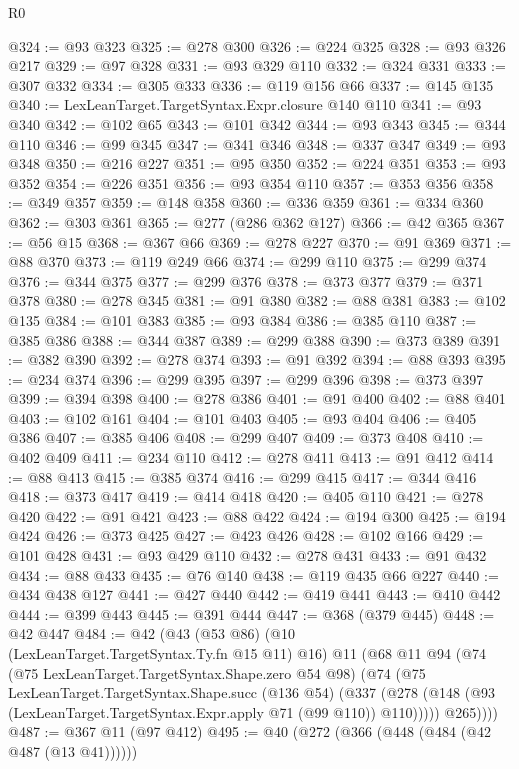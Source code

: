 \begin{lexlean}{R0}
\begin{coremodule}
@324 := @93 @323
@325 := @278 @300
@326 := @224 @325
@328 := @93 @326 @217
@329 := @97 @328
@331 := @93 @329 @110
@332 := @324 @331
@333 := @307 @332
@334 := @305 @333
@336 := @119 @156 @66
@337 := @145 @135
@340 := LexLeanTarget.TargetSyntax.Expr.closure @140 @110
@341 := @93 @340
@342 := @102 @65
@343 := @101 @342
@344 := @93 @343
@345 := @344 @110
@346 := @99 @345
@347 := @341 @346
@348 := @337 @347
@349 := @93 @348
@350 := @216 @227
@351 := @95 @350
@352 := @224 @351
@353 := @93 @352
@354 := @226 @351
@356 := @93 @354 @110
@357 := @353 @356
@358 := @349 @357
@359 := @148 @358
@360 := @336 @359
@361 := @334 @360
@362 := @303 @361
@365 := @277 (@286 @362 @127)
@366 := @42 @365
@367 := @56 @15
@368 := @367 @66
@369 := @278 @227
@370 := @91 @369
@371 := @88 @370
@373 := @119 @249 @66
@374 := @299 @110
@375 := @299 @374
@376 := @344 @375
@377 := @299 @376
@378 := @373 @377
@379 := @371 @378
@380 := @278 @345
@381 := @91 @380
@382 := @88 @381
@383 := @102 @135
@384 := @101 @383
@385 := @93 @384
@386 := @385 @110
@387 := @385 @386
@388 := @344 @387
@389 := @299 @388
@390 := @373 @389
@391 := @382 @390
@392 := @278 @374
@393 := @91 @392
@394 := @88 @393
@395 := @234 @374
@396 := @299 @395
@397 := @299 @396
@398 := @373 @397
@399 := @394 @398
@400 := @278 @386
@401 := @91 @400
@402 := @88 @401
@403 := @102 @161
@404 := @101 @403
@405 := @93 @404
@406 := @405 @386
@407 := @385 @406
@408 := @299 @407
@409 := @373 @408
@410 := @402 @409
@411 := @234 @110
@412 := @278 @411
@413 := @91 @412
@414 := @88 @413
@415 := @385 @374
@416 := @299 @415
@417 := @344 @416
@418 := @373 @417
@419 := @414 @418
@420 := @405 @110
@421 := @278 @420
@422 := @91 @421
@423 := @88 @422
@424 := @194 @300
@425 := @194 @424
@426 := @373 @425
@427 := @423 @426
@428 := @102 @166
@429 := @101 @428
@431 := @93 @429 @110
@432 := @278 @431
@433 := @91 @432
@434 := @88 @433
@435 := @76 @140
@438 := @119 @435 @66 @227
@440 := @434 @438 @127
@441 := @427 @440
@442 := @419 @441
@443 := @410 @442
@444 := @399 @443
@445 := @391 @444
@447 := @368 (@379 @445)
@448 := @42 @447
@484 := @42
    (@43
      (@53 @86)
      (@10 (LexLeanTarget.TargetSyntax.Ty.fn @15 @11) @16)
      @11
      (@68
        @11
        @94
        (@74
          (@75 LexLeanTarget.TargetSyntax.Shape.zero @54 @98)
          (@74
            (@75
              LexLeanTarget.TargetSyntax.Shape.succ
              (@136 @54)
              (@337
                (@278 (@148 (@93 (LexLeanTarget.TargetSyntax.Expr.apply @71 (@99 @110)) @110)))))
            @265))))
@487 := @367 @11 (@97 @412)
@495 := @40 (@272 (@366 (@448 (@484 (@42 @487 (@13 @41))))))

\end{coremodule}
\end{lexlean}
